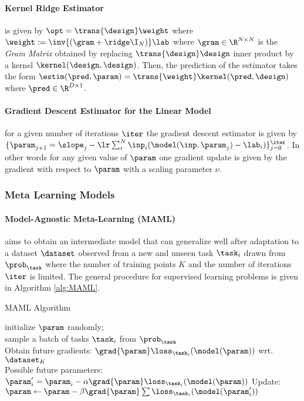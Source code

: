 \paragraph{Kernel Ridge Estimator} is given by $\opt= \trans{\design}\weight$ where $\weight:=\inv{(\gram+\ridge\I_{N})}\lab$ where $\gram\in\R^{N\times N}$ is the  \textit{Gram Matrix} obtained by replacing $\trans{\design}\design$ inner product by a kernel $\kernel(\design, \design)$. Then, the prediction of the estimator takes the form $\estim(\pred,\param)=\trans{\weight}\kernel(\pred,\design)$ where $\pred\in\R^{D\times 1}$.

\paragraph{Gradient Descent Estimator for the Linear Model} for a given number of iterations $\iter$ the gradient descent estimator is given by $\{\param_{j+1}=\slope_{j} - \lr\sum_i^{N}\inp_i(\model(\inp,\param_j)-\lab_i)\}_{j=0}^{\iter}$. In other words for any given value of $\param$ one gradient update is given by the gradient with respect to $\param$ with a scaling parameter $\nu$. 

\subsubsection{Meta Learning Models}

\paragraph{Model-Agnostic Meta-Learning (MAML)} aims to obtain an intermediate model that can generalize well after adaptation to a dataset $\dataset$ observed from a new and unseen task $\task_i$ drawn from $\prob_\task$ where the number of training points $K$ and the number of iterations $\iter$ is limited. The general procedure for supervised learning problems is given in Algorithm \ref{alg:MAML}.

\begin{algorithm}
  \caption{MAML\cite{finn2017} Algorithm}\label{alg:MAML}
  \KwData{$\prob_{\task}$, $\alpha$, $\beta$}
  initialize $\param$ randomly; \\
  {
    sample a batch of tasks $\task_i$ from $\prob_{\task}$\\
    {
      Obtain future gradients: $\grad{\param}\loss_{\task_i}(\model(\param))$ wrt. $\dataset_K$ \\
      Possible future parameters: $\param_i^\prime = \param_i -\alpha\grad{\param}\loss_{\task_i}(\model(\param))$
    }
    Update: $\param \leftarrow \param- \beta\grad{\param}\sum\loss_{\task_i}(\model(\param_i^\prime))$
  }
\end{algorithm}

